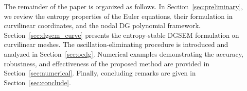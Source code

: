 \documentclass[fleqn,11pt]{amsart}
\begin{document}
The remainder of the paper is organized as follows.
In Section~\ref{sec:preliminary}, we review the entropy properties of the Euler equations, their formulation in curvilinear coordinates, and the nodal DG polynomial framework.
Section~\ref{sec:dgsem_curve} presents the entropy-stable DGSEM formulation on curvilinear meshes.
The oscillation-eliminating procedure is introduced and analyzed in Section~\ref{sec:oedg}.
Numerical examples demonstrating the accuracy, robustness, and effectiveness of the proposed method are provided in Section~\ref{sec:numerical}.
Finally, concluding remarks are given in Section~\ref{sec:conclude}.

\end{document}
